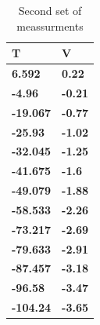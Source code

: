 \documentclass[12pt,a4paper]{report}
\begin{document}
\begin{table}[H]
\centering
\begin{tabular}{|l|l|}
\hline
\textbf{T} & \textbf{V}  \\ \hline
\textbf{6.592}    & \textbf{0.22}       \\ \hline
\textbf{-4.96}    & \textbf{-0.21}      \\ \hline
\textbf{-19.067}  & \textbf{-0.77}      \\ \hline
\textbf{-25.93}   & \textbf{-1.02}      \\ \hline
\textbf{-32.045}  & \textbf{-1.25}      \\ \hline
\textbf{-41.675}  & \textbf{-1.6}       \\ \hline
\textbf{-49.079}  & \textbf{-1.88}      \\ \hline
\textbf{-58.533}  & \textbf{-2.26}      \\ \hline
\textbf{-73.217}  & \textbf{-2.69}      \\ \hline
\textbf{-79.633}  & \textbf{-2.91}      \\ \hline
\textbf{-87.457}  & \textbf{-3.18}      \\ \hline
\textbf{-96.58}   & \textbf{-3.47}      \\ \hline
\textbf{-104.24}  & \textbf{-3.65}      \\ \hline
\end{tabular}

\caption{Second set of meassurments}
\end{table}
\end{document}
